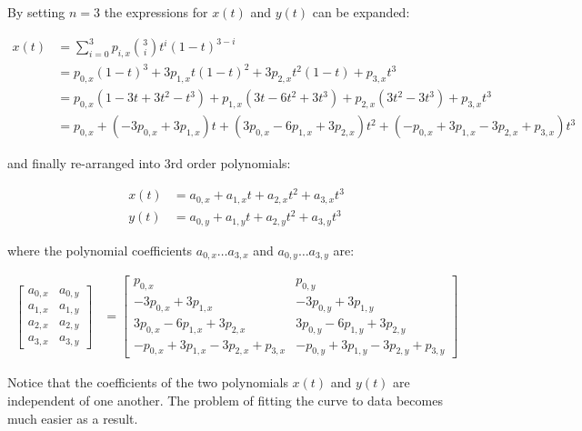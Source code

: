 By setting $n=3$ the expressions for $x(t)$ and $y(t)$ can be expanded:

\begin{align}
    x(t) &= \sum_{i=0}^3 p_{i,x} {3\choose i} t^i(1-t)^{3-i} \\
         &= p_{0,x}(1-t)^3 + 3p_{1,x}t(1-t)^2 + 3p_{2,x}t^2(1-t) + p_{3,x}t^3 \\
         &= p_{0,x}(1-3t+3t^2-t^3) + p_{1,x}(3t-6t^2+3t^3) + p_{2,x}(3t^2-3t^3) + p_{3,x}t^3 \\
         &= p_{0,x} + (-3p_{0,x} +3p_{1,x})t + (3p_{0,x} -6p_{1,x} +3p_{2,x})t^2 + (-p_{0,x}+3p_{1,x}-3p_{2,x}+p_{3,x})t^3
\end{align}

and finally re-arranged into 3rd order polynomials:

\begin{align}
    x(t) &= a_{0,x} + a_{1,x} t + a_{2,x} t^2 + a_{3,x} t^3 \label{eq:bezier_x} \\
    y(t) &= a_{0,y} + a_{1,y} t + a_{2,y} t^2 + a_{3,y} t^3 \label{eq:bezier_y}
\end{align}

where the polynomial coefficients $a_{0,x} \ldots a_{3,x}$ and $a_{0,y} \ldots a_{3,y}$ are:

\begin{align}
    \begin{bmatrix}
        a_{0,x} & a_{0,y} \\
        a_{1,x} & a_{1,y} \\
        a_{2,x} & a_{2,y} \\
        a_{3,x} & a_{3,y}
    \end{bmatrix}
    &=
    \left[\begin{array}{ll}
        p_{0,x}                                   & p_{0,y} \\
        -3p_{0,x} + 3p_{1,x}                      & -3p_{0,y} + 3p_{1,y} \\
        3p_{0,x}  - 6p_{1,x} + 3p_{2,x}           & 3p_{0,y}  - 6p_{1,y} + 3p_{2,y} \\
        -p_{0,x}  + 3p_{1,x} - 3p_{2,x} + p_{3,x} & -p_{0,y}  + 3p_{1,y} - 3p_{2,y} + p_{3,y}
    \end{array}\right]
\end{align}

Notice that  the  coefficients  of  the  two  polynomials $x(t)$ and $y(t)$ are
independent of one another. The problem of  fitting  the  curve to data becomes
much easier as a result.

